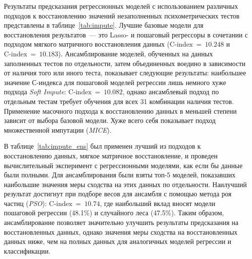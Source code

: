 

Результаты предсказания регрессионных моделей с использованием различных подходов к восстановлению значений незаполненных психометрических тестов представлены в таблице~\ref{tab:impute}. Лучшие базовые модели для восстановления результатов~--- это Lasso- и пошаговый регрессоры в сочетании с подходом мягкого матричного восстановления данных ($\text{C‑index}~=~10.248$ и $\text{C‑index}~=~10.183$). Ансамблирование моделей, обученных на данных заполненных тестов по отдельности, затем объединенных воедино в зависимости от наличия того или иного теста, показывает следующие результаты: наибольшее значение С-индекса для пошаговой моделей регрессии лишь немного хуже подхода \emph{Soft Impute}: $\text{C‑index}~=~10.082$, однако ансамблевый подход по отдельным тестам требует обучения для всех 31 комбинации наличия тестов. Применение масочного подхода к восстановлению данных в меньшей степени зависит от выбора базовой модели. Хуже всего себя показывает подход множественной импутации (\emph{MICE}).


В таблице~\ref{tab:impute_ens} был применен лучший из подходов к восстановлению данных, мягкое матричное восстановление, и проведен вычислительный эксперимент с регрессионными моделями, как если бы данные были полными. Для ансамблирования были взяты топ-5 моделей, показавших наибольшие значения меры сходства на этих данных по отдельности. Наилучший результат достигнут при подборе весов для ансамбля с помощью метода роя частиц (\emph{PSO}): $\text{C‑index}~=~10.74$, где наибольший вклад вносят модели пошаговой регрессии (48.1\%) и случайного леса (47.5\%). Таким образом, ансамблирование позволяет значительно улучшить результаты предсказания на восстановленных данных, однако значения меры сходства на восстановленных данных ниже, чем на полных данных для аналогичных моделей регрессии и классификации.